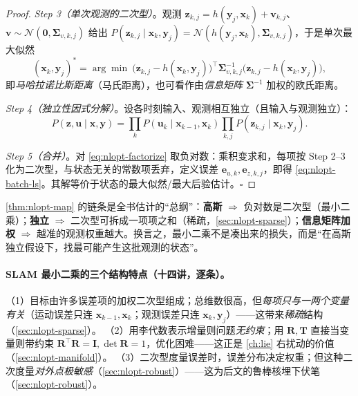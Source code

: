 \begin{proof}
\emph{Step 3（单次观测的二次型）}。观测 $\mathbf{z}_{k,j}=h(\mathbf{y}_j,\mathbf{x}_k)+\mathbf{v}_{k,j}$、$\mathbf{v}\sim\mathcal{N}(\mathbf{0},\boldsymbol{\Sigma}_{v,k,j})$ 给出 $P(\mathbf{z}_{k,j}\mid\mathbf{x}_k,\mathbf{y}_j)=\mathcal{N}(h(\mathbf{y}_j,\mathbf{x}_k),\boldsymbol{\Sigma}_{v,k,j})$，于是单次最大似然
\begin{equation}
  (\mathbf{x}_k,\mathbf{y}_j)^*=\arg\min\ \big(\mathbf{z}_{k,j}-h(\mathbf{x}_k,\mathbf{y}_j)\big)^\top\boldsymbol{\Sigma}_{v,k,j}^{-1}\big(\mathbf{z}_{k,j}-h(\mathbf{x}_k,\mathbf{y}_j)\big),
  \label{eq:nlopt-mahal}
\end{equation}
即\emph{马哈拉诺比斯距离}（马氏距离），也可看作由\emph{信息矩阵} $\boldsymbol{\Sigma}^{-1}$ 加权的欧氏距离\cite{gaoxiang2019slam14}。

\emph{Step 4（独立性因式分解）}。设各时刻输入、观测相互独立（且输入与观测独立）：
\begin{equation}
  P(\mathbf{z},\mathbf{u}\mid\mathbf{x},\mathbf{y})=\prod_k P(\mathbf{u}_k\mid\mathbf{x}_{k-1},\mathbf{x}_k)\prod_{k,j}P(\mathbf{z}_{k,j}\mid\mathbf{x}_k,\mathbf{y}_j).
  \label{eq:nlopt-factorize}
\end{equation}

\emph{Step 5（合并）}。对 \cref{eq:nlopt-factorize} 取负对数：乘积变求和，每项按 Step 2--3 化为二次型，与状态无关的常数项丢弃，定义误差 $\mathbf{e}_{u,k},\mathbf{e}_{z,k,j}$，即得 \cref{eq:nlopt-batch-ls}。其解等价于状态的最大似然/最大后验估计。\hfill$\square$
\end{proof}

\begin{insight}
\cref{thm:nlopt-map} 的链条是全书估计的“总纲”：\textbf{高斯} $\Rightarrow$ 负对数是二次型（最小二乘）；\textbf{独立} $\Rightarrow$ 二次型可拆成一项项之和（稀疏，\cref{sec:nlopt-sparse}）；\textbf{信息矩阵加权} $\Rightarrow$ 越准的观测权重越大。换言之，最小二乘不是凑出来的损失，而是“在高斯独立假设下，找最可能产生这批观测的状态”。
\end{insight}

\paragraph{SLAM 最小二乘的三个结构特点（十四讲，逐条）。}\cite{gaoxiang2019slam14}
（1）目标由许多误差项的加权二次型组成；总维数很高，但\emph{每项只与一两个变量有关}（运动误差只连 $\mathbf{x}_{k-1},\mathbf{x}_k$；观测误差只连 $\mathbf{x}_k,\mathbf{y}_j$）——这带来\emph{稀疏}结构（\cref{sec:nlopt-sparse}）。
（2）用李代数表示增量则问题\emph{无约束}；用 $\mathbf{R},\mathbf{T}$ 直接当变量则带约束 $\mathbf{R}^\top\mathbf{R}=\mathbf{I},\det\mathbf{R}=1$，优化困难——这正是 \cref{ch:lie} 右扰动的价值（\cref{sec:nlopt-manifold}）。
（3）二次型度量误差时，误差分布决定权重；但这种二次度量\emph{对外点极敏感}（\cref{sec:nlopt-robust}）——这为后文的鲁棒核埋下伏笔（\cref{sec:nlopt-robust}）。

